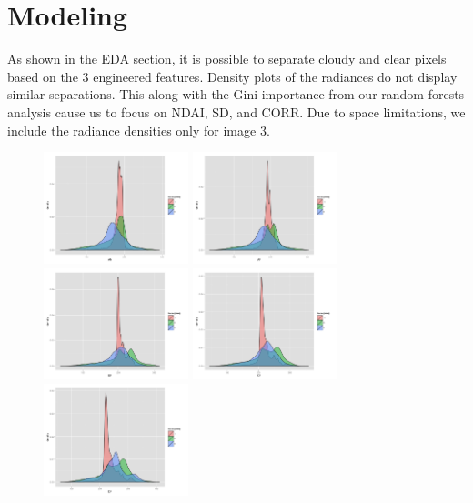\documentclass{article}\usepackage[]{graphicx}\usepackage[]{color}
\begin{document}
\section{Modeling} As shown in the EDA section, it is possible to separate cloudy and clear pixels based on the 3 engineered features. Density plots of the radiances do not display similar separations. This along with the Gini importance from our random forests analysis cause us to focus on NDAI, SD, and CORR. Due to space limitations, we include the radiance densities only for image 3.
\begin{figure}[H]
\begin{center}
\includegraphics[height = 3.25cm, width = 3.25 cm]{ANEDA.png}
\includegraphics[height = 3.25cm, width = 3.25 cm]{AFEDA.png}
\includegraphics[height = 3.25cm, width = 3.25 cm]{BFEDA.png}
\includegraphics[height = 3.25cm, width = 3.25 cm]{CFEDA.png}
\includegraphics[height = 3.25cm, width = 3.25 cm]{DFEDA.png}
\end{center}
\end{figure}
\end{document}
